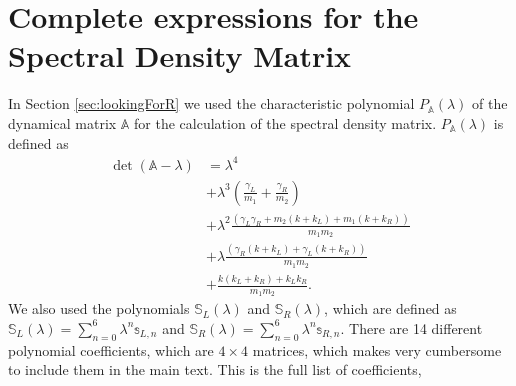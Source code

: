 \section{Complete expressions for the Spectral Density Matrix\label{AppSpecDenMat}}
%
%
In Section \ref{sec:lookingForR} we used the characteristic polynomial $P_{\mathbb{A}}(\lambda)$ of the dynamical matrix $\mathbb{A}$ for the calculation of the spectral density matrix. $P_{\mathbb{A}}(\lambda)$ is defined as
\begin{equation}
  \begin{split}
    \det(\mathbb{A}-\lambda) &= \lambda ^4 \\&+ \lambda ^3 \left(\frac{\gamma_L}{m_1}+\frac{\gamma_R}{m_2}\right) \\ &+ \lambda^2\frac{ (\gamma_L \gamma_R+m_2 (k+k_L)+m_1 (k+k_R))}{m_1 m_2}\\ &+ \lambda \frac{  (\gamma_R (k+k_L)+\gamma_L (k+k_R))}{m_1 m_2}\\ &+\frac{k (k_L+k_R)+k_L k_R}{m_1 m_2}.
  \end{split}
\end{equation}
%
We also used the polynomials $\mathbb{S}_L(\lambda)$ and $\mathbb{S}_R(\lambda)$, which are defined as $\mathbb{S}_L(\lambda)=\sum\limits_{n=0}^6 \lambda^n \mathbb{s}_{L,n}$ and $\mathbb{S}_R(\lambda)=\sum\limits_{n=0}^6 \lambda^n \mathbb{s}_{R,n}$. There are 14 different polynomial coefficients, which are $4\times 4$ matrices, which makes very cumbersome to include them in the main text. This is the full list of coefficients,
%

